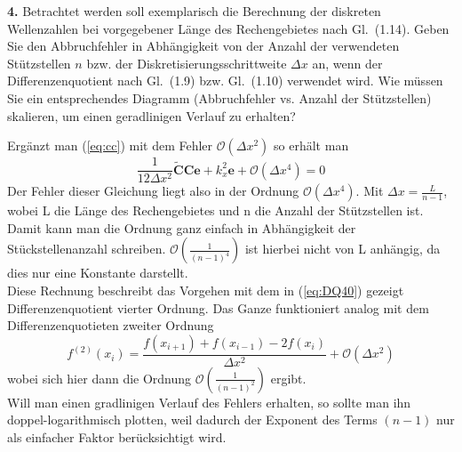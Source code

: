 \documentclass[Protokollheft.tex]{subfiles}
\begin{document}
	\begin{framed}
		\noindent \textbf{4.} Betrachtet werden soll exemplarisch die Berechnung der diskreten Wellenzahlen bei vorgegebener Länge des Rechengebietes nach Gl.~(1.14).
		Geben Sie den Abbruchfehler in Abhängigkeit von der Anzahl der verwendeten Stützstellen $n$ bzw. der Diskretisierungsschrittweite $\Delta x$ an,
		wenn der Differenzenquotient nach Gl.~(1.9) bzw. Gl.~(1.10) verwendet wird.
		Wie müssen Sie ein entsprechendes Diagramm (Abbruchfehler vs. Anzahl der Stützstellen) skalieren, um einen geradlinigen Verlauf zu erhalten?\label{exer:failureTerm}
	\end{framed}
	\noindent
	Ergänzt man (\ref{eq:cc}) mit dem Fehler $\mathcal{O}(\Delta x^2)$ so erhält man
	\begin{equation}
	\frac{1}{12\Delta x^2}\mathbf{\widetilde{C}Ce}+k^2_x\mathbf{e}+\mathcal{O}(\Delta x^4)=0
	\end{equation}
	Der Fehler dieser Gleichung liegt also in der Ordnung $\mathcal{O}(\Delta x^4)$. Mit $\Delta x=\frac{L}{n-1}$, wobei L die Länge des Rechengebietes und n die Anzahl der Stützstellen ist. Damit kann man die Ordnung ganz einfach in Abhängigkeit der Stückstellenanzahl schreiben. $\mathcal{O}(\frac{1}{(n-1)^4})$ ist hierbei nicht von L anhängig, da dies nur eine Konstante darstellt.\\
	Diese Rechnung beschreibt das Vorgehen mit dem in (\ref{eq:DQ40}) gezeigt Differenzenquotient vierter Ordnung. Das Ganze funktioniert analog mit dem Differenzenquotieten zweiter Ordnung
	\begin{equation*}
		f^{(2)}(x_i)=\frac{f(x_{i+1})+f(x_{i-1})-2f(x_i)}{\Delta x^2}+\mathcal{O}(\Delta x^2)
	\end{equation*}
	wobei sich hier dann die Ordnung $\mathcal{O}(\frac{1}{(n-1)^2})$ ergibt.\\
	Will man einen gradlinigen Verlauf des Fehlers erhalten, so sollte man ihn doppel-logarithmisch plotten, weil dadurch der Exponent des Terms $(n-1)$ nur als einfacher Faktor berücksichtigt wird.
	
\end{document}
